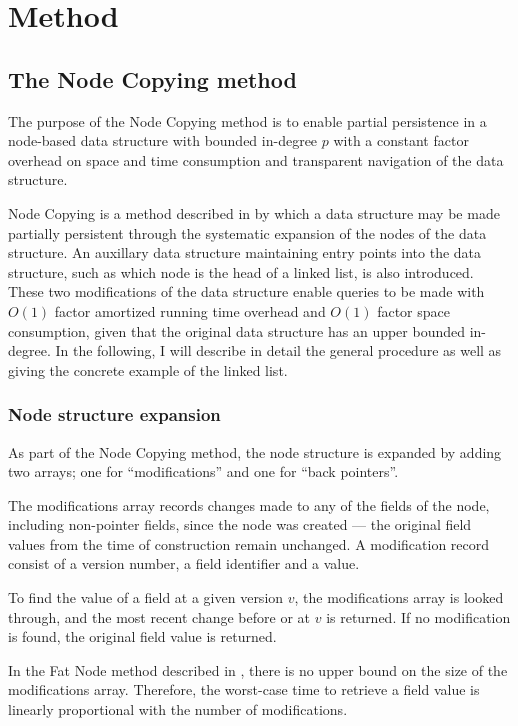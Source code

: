 \chapter{Method}

\section{The Node Copying method}
The purpose of the Node Copying method is to enable partial persistence in a
node-based data structure with bounded in-degree $p$ with a constant factor
overhead on space and time consumption and transparent navigation of the data
structure.

Node Copying is a method described in \cite{Driscoll198986} by which a data
structure may be made partially persistent through the systematic expansion of
the nodes of the data structure. An auxillary data structure maintaining entry
points into the data structure, such as which node is the head of a linked list,
is also introduced. These two modifications of the data structure enable queries
to be made with $O(1)$ factor amortized running time overhead and $O(1)$ factor
space consumption, given that the original data structure has an upper bounded
in-degree. In the following, I will describe in detail the general procedure as
well as giving the concrete example of the linked list.

\subsection{Node structure expansion}
As part of the Node Copying method, the node structure is expanded by adding two
arrays; one for ``modifications'' and one for ``back pointers''.

The modifications array records changes made to any of the fields of the
node, including non-pointer fields, since the node was created --- the original
field values from the time of construction remain unchanged. A modification
record consist of a version number, a field identifier and a value.

To find the value of a field at a given version $v$, the modifications array is
looked through, and the most recent change before or at $v$ is returned. If no
modification is found, the original field value is returned.

In the Fat Node method described in \cite{Driscoll198986}, there is no upper
bound on the size of the modifications array. Therefore, the worst-case time to
retrieve a field value is linearly proportional with the number of
modifications.

